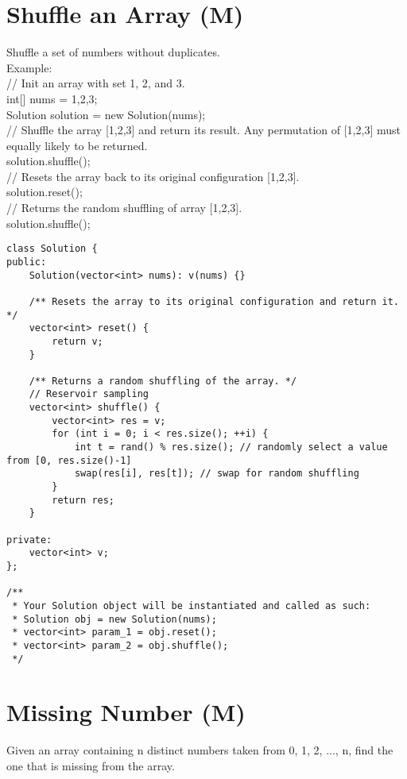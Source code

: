 \section{Shuffle an Array (M)}
Shuffle a set of numbers without duplicates.\\

Example:\\
// Init an array with set 1, 2, and 3.\\
int[] nums = {1,2,3};\\
Solution solution = new Solution(nums);\\

// Shuffle the array [1,2,3] and return its result. Any permutation of [1,2,3] must equally likely to be returned.\\
solution.shuffle();\\

// Resets the array back to its original configuration [1,2,3].\\
solution.reset();\\

// Returns the random shuffling of array [1,2,3].\\
solution.shuffle();\\

\begin{lstlisting}
class Solution {
public:
    Solution(vector<int> nums): v(nums) {}
    
    /** Resets the array to its original configuration and return it. */
    vector<int> reset() {
        return v;
    }
    
    /** Returns a random shuffling of the array. */
    // Reservoir sampling
    vector<int> shuffle() {
        vector<int> res = v;
        for (int i = 0; i < res.size(); ++i) {
            int t = rand() % res.size(); // randomly select a value from [0, res.size()-1]
            swap(res[i], res[t]); // swap for random shuffling
        }
        return res;
    }
    
private:
    vector<int> v;
};

/**
 * Your Solution object will be instantiated and called as such:
 * Solution obj = new Solution(nums);
 * vector<int> param_1 = obj.reset();
 * vector<int> param_2 = obj.shuffle();
 */
\end{lstlisting}


\section{Missing Number (M)}
Given an array containing n distinct numbers taken from 0, 1, 2, ..., n, find the one that is missing from the array.\\

